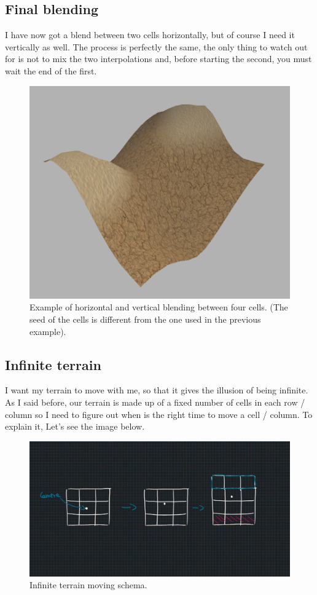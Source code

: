 \subsection{Final blending}
I have now got a blend between two cells horizontally, but of course I need it vertically as well. The process is perfectly the same, the only thing to watch out for is not to mix the two interpolations and, before starting the second, you must wait the end of the first.

\begin{figure}[hbt!]
	\centering
	\includegraphics[width= 1
	\textwidth]{images/terrain8.png}
	\caption{Example of horizontal and vertical blending between four cells. (The seed of the cells is different from the one used in the previous example).}
\end{figure} 


\subsection{Infinite terrain}
\label{sub::infinteTerrain}
I want my terrain to move with me, so that it gives the illusion of being infinite. As I said before, our terrain is made up of a fixed number of cells in each row / column so I need to figure out when is the right time to move a cell / column. To explain it, Let's see the image below.

\begin{figure}[hbt!]
	\centering
	\includegraphics[width= 1
	\textwidth]{images/infiniteTerrainSchema.jpg}
	\caption{Infinite terrain moving schema.}
\end{figure} 

